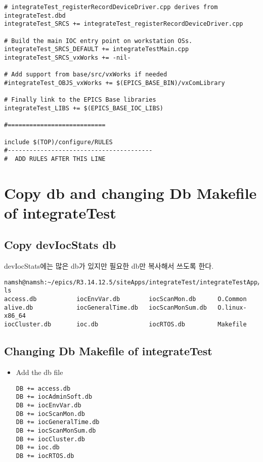 \documentclass[11pt
  , a4paper
  , article
  , oneside
]{memoir}
\begin{document}
\begin{lstlisting}[style=termstyle]
# integrateTest_registerRecordDeviceDriver.cpp derives from integrateTest.dbd
integrateTest_SRCS += integrateTest_registerRecordDeviceDriver.cpp

# Build the main IOC entry point on workstation OSs.
integrateTest_SRCS_DEFAULT += integrateTestMain.cpp
integrateTest_SRCS_vxWorks += -nil-

# Add support from base/src/vxWorks if needed
#integrateTest_OBJS_vxWorks += $(EPICS_BASE_BIN)/vxComLibrary

# Finally link to the EPICS Base libraries
integrateTest_LIBS += $(EPICS_BASE_IOC_LIBS)

#===========================

include $(TOP)/configure/RULES
#----------------------------------------
#  ADD RULES AFTER THIS LINE
\end{lstlisting}
\section{Copy db and changing Db Makefile of integrateTest}
\subsection{Copy devIocStats db}
devIocStats에는 많은 db가 있지만 필요한 db만 복사해서 쓰도록 한다.
\begin{lstlisting}[style=termstyle]
namsh@namsh:~/epics/R3.14.12.5/siteApps/integrateTest/integrateTestApp/Db$ ls
access.db           iocEnvVar.db        iocScanMon.db      O.Common
alive.db            iocGeneralTime.db   iocScanMonSum.db   O.linux-x86_64     
iocCluster.db       ioc.db              iocRTOS.db         Makefile           
\end{lstlisting}
\subsection{Changing Db Makefile of integrateTest}
\begin{itemize}
	\item Add the db file
	\begin{lstlisting}[style=termstyle]
DB += access.db 
DB += iocAdminSoft.db
DB += iocEnvVar.db
DB += iocScanMon.db
DB += iocGeneralTime.db
DB += iocScanMonSum.db
DB += iocCluster.db
DB += ioc.db
DB += iocRTOS.db 
\end{lstlisting}
\end{itemize}
\end{document}
